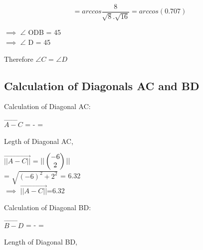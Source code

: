 \documentclass[journal,10pt,twocolumn]{article}
\begin{document}
\begin{equation}
= arccos \frac{8} {\sqrt{8}.\sqrt{16}} = arccos (0.707)
\end{equation}

\begin{flushleft}
$\implies$   $\angle$ ODB = 45 \textdegree\\
\vspace{0.3cm}
$\implies$   $\angle$ D = 45 \textdegree
\end{flushleft}

Therefore $\angle C$ = $\angle D$

\subsection{Calculation of Diagonals AC and BD}
\vspace{0.2cm}
\begin{flushleft}
Calculation of Diagonal AC:\\
\end{flushleft}

\vspace{0.1cm}

$\vec{A-C}$ =  -  = 
	\\
\begin{flushleft}
Legth of Diagonal AC,\\
\end{flushleft}


$\vec{||A-C||}$ = $ || \begin{pmatrix}-6 \\ 2\end{pmatrix} ||$
	\\
\vspace{0.25cm}
= $\sqrt{(-6)^2+2^2}$ = 6.32\\
\vspace{0.3cm}
$\implies$ $\vec{||A-C||}$=6.32\\

\vspace{0.3cm}
\begin{flushleft}
Calculation of Diagonal BD:\\
\end{flushleft}

\vspace{0.25cm}

$\vec{B-D}$ = -  = 
	\\
\begin{flushleft}
Length of Diagonal BD,\\
\end{flushleft}
\end{document}
